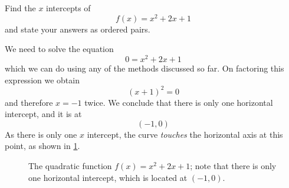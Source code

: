 \begin{myexample}\label{ex:horizints2}
Find the $x$ intercepts of 
\[
	f(x) = x^2+2x+1
\]
and state your answers as ordered pairs.

\end{myexample}
\begin{myProof}
	We need to solve the equation
	\[
		0 = x^2+2x+1
	\]
	which we can do using any of the methods discussed so far. On factoring this \gls{expression} we obtain
	\[
		(x+1)^2=0
	\]
	and therefore $x=-1$ twice. We conclude that there is only one horizontal intercept, and it is at
	\[
		(-1,0)
	\]
	As there is only one $x$ intercept, the curve {\em touches} the horizontal axis at this \gls{point}, as shown 
	in \cref{fig:quad1}.
	\begin{figure}[!ht]
		\centering
		\caption{The quadratic function $f(x)=x^2+2x+1$; note that there is only one horizontal intercept, which is located at $(-1,0)$.}
		\label{fig:quad1}
	\end{figure}
	{}
\end{myProof}

\FloatBarrier

